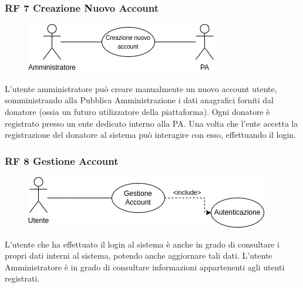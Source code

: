 \documentclass{article}
\begin{document}
\subsubsection{RF 7 Creazione Nuovo Account}\label{rf_7}
\begin{description}
	
	\begin{figure}[htp]
		\centering
		\includegraphics[]{rf7.png}
	\end{figure}
	
	\item L'utente amministratore può creare manualmente un nuovo account utente, somministrando alla Pubblica Amministrazione i dati anagrafici forniti dal donatore (ossia un futuro utilizzatore della piattaforma). Ogni donatore è registrato presso un ente dedicato interno alla PA. Una volta che l'ente accetta la registrazione del donatore al sistema può interagire con esso, effettuando il login.
\end{description}

\clearpage

\subsubsection{RF 8 Gestione Account}\label{rf_8}
\begin{description}
	
	\begin{figure}[htp]
		\centering
		\includegraphics[]{rf8.png}
	\end{figure}	
		
	\item L'utente che ha effettuato il login al sistema è anche in grado di consultare i propri dati interni al sistema, potendo anche aggiornare tali dati. L'utente Amministratore è in grado di consultare informazioni appartenenti agli utenti registrati.
\end{description}
\end{document}

